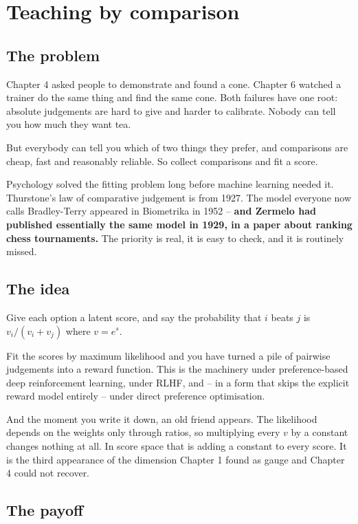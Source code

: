 \chapter{Teaching by comparison}

\section*{The problem}

Chapter 4 asked people to demonstrate and found a cone. Chapter 6 watched a trainer do the same thing and find the same cone. Both failures have one root: absolute judgements are hard to give and harder to calibrate. Nobody can tell you how much they want tea.

But everybody can tell you which of two things they prefer, and comparisons are cheap, fast and reasonably reliable. So collect comparisons and fit a score.

Psychology solved the fitting problem long before machine learning needed it. Thurstone's law of comparative judgement is from 1927. The model everyone now calls Bradley-Terry appeared in Biometrika in 1952 -- \textbf{and Zermelo had published essentially the same model in 1929, in a paper about ranking chess tournaments.} The priority is real, it is easy to check, and it is routinely missed.

\section*{The idea}

Give each option a latent score, and say the probability that $i$ beats $j$ is $v_i / (v_i + v_j)$ where $v = e^{s}$.

Fit the scores by maximum likelihood and you have turned a pile of pairwise judgements into a reward function. This is the machinery under preference-based deep reinforcement learning, under RLHF, and -- in a form that skips the explicit reward model entirely -- under direct preference optimisation.

And the moment you write it down, an old friend appears. The likelihood depends on the weights only through ratios, so multiplying every $v$ by a constant changes nothing at all. In score space that is adding a constant to every score. It is the third appearance of the dimension Chapter 1 found as gauge and Chapter 4 could not recover.

\section*{The payoff}

